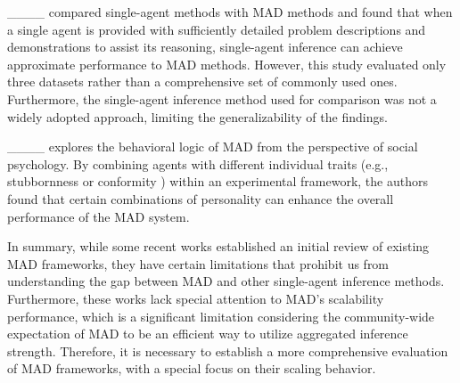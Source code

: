 ____ compared single-agent methods with MAD methods and found that when a single agent is provided with sufficiently detailed problem descriptions and demonstrations to assist its reasoning, single-agent inference can achieve approximate performance to MAD methods. However, this study evaluated only three datasets rather than a comprehensive set of commonly used ones. Furthermore, the single-agent inference method used for comparison was not a widely adopted approach, limiting the generalizability of the findings.

____ explores the behavioral logic of MAD from the perspective of social psychology. By combining agents with different individual traits (e.g., stubbornness or conformity ) within an experimental framework, the authors found that certain combinations of personality can enhance the overall performance of the MAD system.


In summary, while some recent works established an initial review of existing MAD frameworks, they have certain limitations that prohibit us from understanding the gap between MAD and other single-agent inference methods. Furthermore, these works lack special attention to MAD's scalability performance, which is a significant limitation considering the community-wide expectation of MAD to be an efficient way to utilize aggregated inference strength. Therefore, it is necessary to establish a more comprehensive evaluation of MAD frameworks, with a special focus on their scaling behavior.